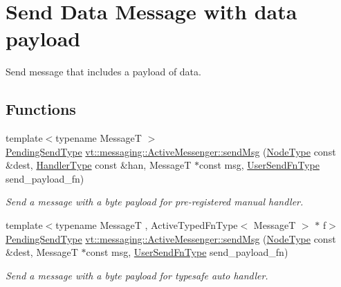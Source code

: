 \hypertarget{group__sendpayload}{}\section{Send Data Message with data payload}
\label{group__sendpayload}


Send message that includes a payload of data.  


\subsection*{Functions}
\begin{DoxyCompactItemize}
\item 
{\footnotesize template$<$typename MessageT $>$ }\\\hyperlink{structvt_1_1messaging_1_1_active_messenger_a3626a6ca76d8ad4ec7c3b47a2c70d3a8}{Pending\+Send\+Type} \hyperlink{group__sendpayload_ga0b1f1f3e364e7b1358a36a386b2e6537}{vt\+::messaging\+::\+Active\+Messenger\+::send\+Msg} (\hyperlink{namespacevt_a866da9d0efc19c0a1ce79e9e492f47e2}{Node\+Type} const \&dest, \hyperlink{namespacevt_af64846b57dfcaf104da3ef6967917573}{Handler\+Type} const \&han, MessageT $\ast$const msg, \hyperlink{structvt_1_1messaging_1_1_active_messenger_a4b1993ad77436b6ed6c7fd32801c50ed}{User\+Send\+Fn\+Type} send\+\_\+payload\+\_\+fn)
\begin{DoxyCompactList}\small\item\em Send a message with a byte payload for pre-\/registered manual handler. \end{DoxyCompactList}\item 
{\footnotesize template$<$typename MessageT , Active\+Typed\+Fn\+Type$<$ Message\+T $>$ $\ast$ f$>$ }\\\hyperlink{structvt_1_1messaging_1_1_active_messenger_a3626a6ca76d8ad4ec7c3b47a2c70d3a8}{Pending\+Send\+Type} \hyperlink{group__sendpayload_ga887dfedb337701fc731c67ba19cf86c8}{vt\+::messaging\+::\+Active\+Messenger\+::send\+Msg} (\hyperlink{namespacevt_a866da9d0efc19c0a1ce79e9e492f47e2}{Node\+Type} const \&dest, MessageT $\ast$const msg, \hyperlink{structvt_1_1messaging_1_1_active_messenger_a4b1993ad77436b6ed6c7fd32801c50ed}{User\+Send\+Fn\+Type} send\+\_\+payload\+\_\+fn)
\begin{DoxyCompactList}\small\item\em Send a message with a byte payload for typesafe auto handler. \end{DoxyCompactList}\end{DoxyCompactItemize}



